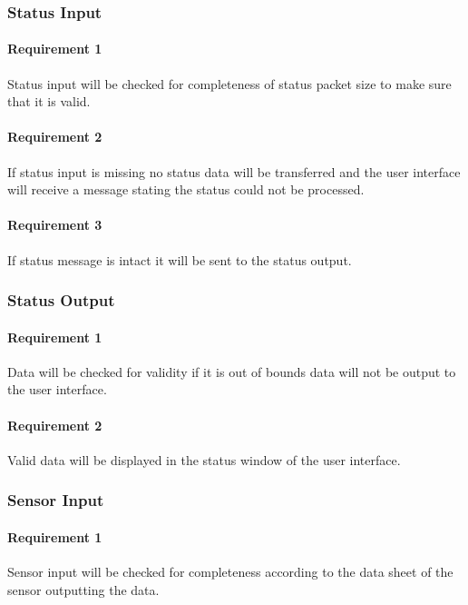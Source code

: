 \documentclass[10pt,draftclsnofoot,onecolumn,retainorgcmds]{IEEEtran}
\begin{document}
\subsubsection{Status Input}
\paragraph{ Requirement 1}Status input will be checked for completeness of status packet size to make sure that it is valid.\par
\paragraph{ Requirement 2}If status input is missing no status data will be transferred and the user interface will receive a message stating the status could not be processed.\par
\paragraph{ Requirement 3} If status message is intact it will be sent to the status output.\par
\subsubsection{Status Output}
\paragraph{ Requirement 1}Data will be checked for validity if it is out of bounds data will not be output to the user interface.\par
\paragraph{ Requirement 2}Valid data will be displayed in the status window of the user interface.\par
\subsubsection{Sensor Input}
\paragraph{ Requirement 1} Sensor input will be checked for completeness according to the data sheet of the sensor outputting the data.\par
\end{document}

